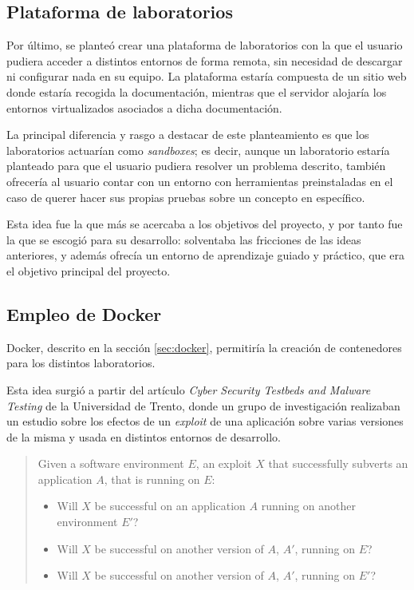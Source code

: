         \subsection{Plataforma de laboratorios}

            Por último, se planteó crear una plataforma de laboratorios con la que el usuario pudiera acceder a distintos entornos de forma remota, sin necesidad de descargar ni configurar nada en su equipo. La plataforma estaría compuesta de un sitio web donde estaría recogida la documentación, mientras que el servidor alojaría los entornos virtualizados asociados a dicha documentación.
            
            La principal diferencia y rasgo a destacar de este planteamiento es que los laboratorios actuarían como \textit{sandboxes}; es decir, aunque un laboratorio estaría planteado para que el usuario pudiera resolver un problema descrito, también ofrecería al usuario contar con un entorno con herramientas preinstaladas en el caso de querer hacer sus propias pruebas sobre un concepto en específico.

            Esta idea fue la que más se acercaba a los objetivos del proyecto, y por tanto fue la que se escogió para su desarrollo: solventaba las fricciones de las ideas anteriores, y además ofrecía un entorno de aprendizaje guiado y práctico, que era el objetivo principal del proyecto.

        \subsection{Empleo de Docker}

            Docker, descrito en la sección \ref{sec:docker}, permitiría la creación de contenedores para los distintos laboratorios.
                
            Esta idea surgió a partir del artículo \textit{Cyber Security Testbeds and Malware Testing} \cite{securitylab-malware-analysis} de la Universidad de Trento, donde un grupo de investigación realizaban un estudio sobre los efectos de un \textit{exploit} de una aplicación sobre varias versiones de la misma y usada en distintos entornos de desarrollo.

            \begin{quotation}
                
                Given a software environment $E$, an exploit $X$ that successfully subverts an application $A$, that is running on $E$:
                
                \begin{itemize}
                    \item Will $X$ be successful on an application $A$ running on another environment $E'$?
                    \item Will $X$ be successful on another version of $A$, $A'$, running on $E$?
                    \item Will $X$ be successful on another version of $A$, $A'$, running on $E'$?
                \end{itemize}

            \end{quotation}

